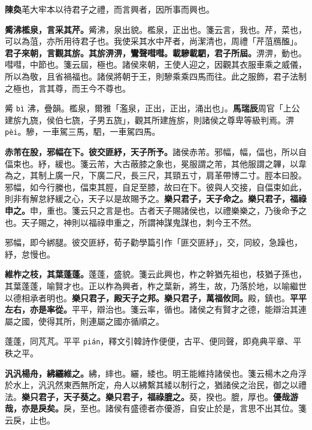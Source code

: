 \begin{quoting}\textbf{陳奐}芼大牢本以待君子之禮，而言興者，因所事而興也。\end{quoting}

\textbf{觱沸檻泉，言采其芹。}{\footnotesize 觱沸，泉出貌。檻泉，正出也。箋云言，我也。芹，菜也，可以為菹，亦所用待君子也。我使采其水中芹者，尚潔清也，周禮「芹菹鴈醢」。}\textbf{君子來朝，言觀其旂。其旂淠淠，鸞聲嘒嘒。載驂載駟，君子所屆。}{\footnotesize 淠淠，動也。嘒嘒，中節也。箋云屆，極也。諸侯來朝，王使人迎之，因觀其衣服車乘之威儀，所以為敬，且省禍福也。諸侯將朝于王，則驂乘乘四馬而往。此之服飾，君子法制之極也，言其尊，而王今不尊也。}

\begin{quoting}觱 \texttt{bì} 沸，疊韻。檻泉，爾雅「濫泉，正出，正出，涌出也」。\textbf{馬瑞辰}周官「上公建旂九旒，侯伯七旒，子男五旒」，觀其所建旌旂，則諸侯之尊卑等級判焉。淠 \texttt{pèi}。驂，一車駕三馬，駟，一車駕四馬。\end{quoting}

\textbf{赤芾在股，邪幅在下。彼交匪紓，天子所予。}{\footnotesize 諸侯赤芾。邪幅，幅，偪也，所以自偪束也。紓，緩也。箋云芾，大古蔽膝之象也，冕服謂之芾，其他服謂之韠，以韋為之，其制上廣一尺，下廣二尺，長三尺，其頸五寸，肩革帶博二寸。脛本曰股。邪幅，如今行縢也，偪束其脛，自足至膝，故曰在下。彼與人交接，自偪束如此，則非有解怠紓緩之心，天子以是故賜予之。}\textbf{樂只君子，天子命之。樂只君子，福祿申之。}{\footnotesize 申，重也。箋云只之言是也。古者天子賜諸侯也，以禮樂樂之，乃後命予之也。天子賜之，神則以福祿申重之，所謂神謀鬼謀也，刺今王不然。}

\begin{quoting}邪幅，即今綁腿。彼交匪紓，荀子勸學篇引作「匪交匪紓」，交，同絞，急躁也，紓，怠慢也。\end{quoting}

\textbf{維柞之枝，其葉蓬蓬。}{\footnotesize 蓬蓬，盛貌。箋云此興也，柞之幹猶先祖也，枝猶子孫也，其葉蓬蓬，喻賢才也。正以柞為興者，柞之葉新，將生，故，乃落於地，以喻繼世以德相承者明也。}\textbf{樂只君子，殿天子之邦。樂只君子，萬福攸同。}{\footnotesize 殿，鎮也。}\textbf{平平左右，亦是率從。}{\footnotesize 平平，辯治也。箋云率，循也。諸侯之有賢才之德，能辯治其連屬之國，使得其所，則連屬之國亦循順之。}

\begin{quoting}蓬蓬，同芃芃。平平 \texttt{pián}，釋文引韓詩作便便，古平、便同聲，即堯典平章、平秩之平。\end{quoting}

\textbf{汎汎楊舟，紼纚維之。}{\footnotesize 紼，繂也。纚，緌也。明王能維持諸侯也。箋云楊木之舟浮於水上，汎汎然東西無所定，舟人以紼繫其緌以制行之，猶諸侯之治民，御之以禮法。}\textbf{樂只君子，天子葵之。樂只君子，福祿膍之。}{\footnotesize 葵，揆也。膍，厚也。}\textbf{優哉游哉，亦是戾矣。}{\footnotesize 戾，至也。諸侯有盛德者亦優游，自安止於是，言思不出其位。箋云戾，止也。}

